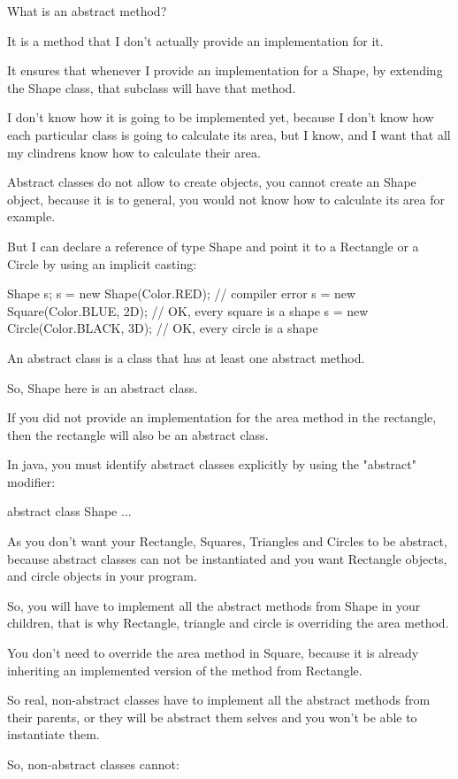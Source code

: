 \documentclass[a4paper, 9pt]{extarticle}
\begin{document}
\begin{blackboard}
What is an abstract method?

It is a method that I don't actually provide an implementation for it.

It ensures that whenever I provide an implementation for a Shape, by extending
the Shape class, that subclass will have that method.

I don't know how it is going to be implemented yet, because I don't know how
each particular class is going to calculate its area, but I know, and I want
that all my clindrens know how to calculate their area.

Abstract classes do not allow to create objects, you cannot create an Shape
object, because it is to general, you would not know how to calculate its area
for example.

But I can declare a reference of type Shape and point it to a Rectangle or a
Circle by using an implicit casting:

Shape s;
s = new Shape(Color.RED); // compiler error
s = new Square(Color.BLUE, 2D); // OK, every square is a shape
s = new Circle(Color.BLACK, 3D); // OK, every circle is a shape

An abstract class is a class that has at least one abstract method.

So, Shape here is an abstract class.

If you did not provide an implementation for the area method in the rectangle,
then the rectangle will also be an abstract class.

In java, you must identify abstract classes explicitly by using the "abstract"
modifier:

abstract class Shape {
...
}

As you don't want your Rectangle, Squares, Triangles and Circles to be
abstract, because abstract classes can not be instantiated and you want
Rectangle objects, and circle objects in your program.

So, you will have to implement all the abstract methods from Shape in your
children, that is why Rectangle, triangle and circle is overriding the area
method.

You don't need to override the area method in Square, because it is already
inheriting an implemented version of the method from Rectangle.

So real, non-abstract classes have to implement all the abstract methods from
their parents, or they will be abstract them selves and you won't be able to
instantiate them.

So, non-abstract classes cannot:


\end{blackboard}
\end{document}
